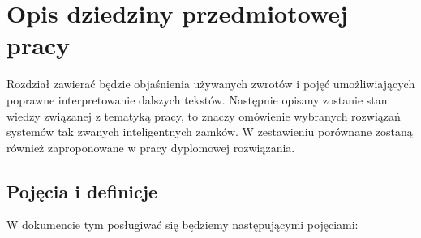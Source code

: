 % 
\newpage
\section{Opis dziedziny przedmiotowej pracy}\label{sec:dziedzina}
Rozdział zawierać będzie objaśnienia używanych zwrotów i pojęć umożliwiających poprawne interpretowanie dalszych tekstów. Następnie opisany zostanie stan wiedzy związanej z tematyką pracy, to znaczy omówienie wybranych rozwiązań systemów tak zwanych inteligentnych zamków. W zestawieniu porównane zostaną również zaproponowane w pracy dyplomowej rozwiązania.
\subsection{Pojęcia i definicje}\label{sec:Pojęcia i definicje}
W dokumencie tym posługiwać się będziemy następującymi pojęciami:
